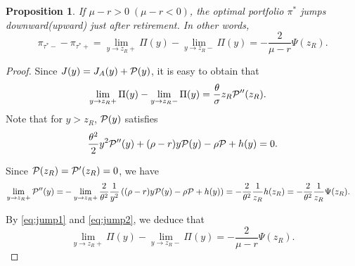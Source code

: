 \documentclass[a4paper,report, 11pt]{article}
\newtheorem{pro}{Proposition}[section]
\def\m{\mu}
\def\s{\sigma}
\def\t{\theta}
\begin{document}
\begin{pro}
	If $\m-r>0\; (\m-r<0)$, the optimal portfolio $\pi^*$ jumps downward\;(upward) just after retirement. In other words, 
	\begin{equation*}
	\pi_{\tau^*-}-\pi_{\tau^*+}=\lim_{y\to z_R+}\Pi(y)-\lim_{y\to z_R-}\Pi(y)=-\dfrac{2}{\m-r}\Psi(z_R).
	\end{equation*}
\end{pro}
\begin{proof}
Since $J(y)=J_A(y)+{\cal P}(y)$, it is easy to obtain that 
\begin{align}\label{eq:jump1}
	\lim_{y\to z_R+}\Pi(y)-\lim_{y\to z_R-}\Pi(y)&=\dfrac{\t}{\s}z_R{\cal P}''(z_R).
\end{align}
Note that for $y>z_R$, ${\cal P}(y)$ satisfies 
\begin{equation*}
\dfrac{\t^2}{2}y^2{\cal P}''(y) + (\rho-r)y{\cal P}(y) - \rho {\cal P} + {h}(y)=0.
\end{equation*}

Since ${\cal P}(z_R)={\cal P}'(z_R)=0$, we have 
\begin{align}\label{eq:jump2}
\lim_{y\to z_R+}{\cal P}''(y)=&-\lim_{y\to z_R+}\dfrac{2}{\t^2}\dfrac{1}{y^2}\left((\rho-r)y{\cal P}(y) - \rho {\cal P} + {h}(y)\right)
=-\dfrac{2}{\t^2}\dfrac{1}{z_R}h(z_R)=-\dfrac{2}{\t^2}\dfrac{1}{z_R}\Psi(z_R).
\end{align}

By \eqref{eq:jump1} and \eqref{eq:jump2}, we deduce that 
	\begin{equation*}
\lim_{y\to z_R+}\Pi(y)-\lim_{y\to z_R-}\Pi(y)=-\dfrac{2}{\m-r}\Psi(z_R).
\end{equation*}
\end{proof}
\end{document}
